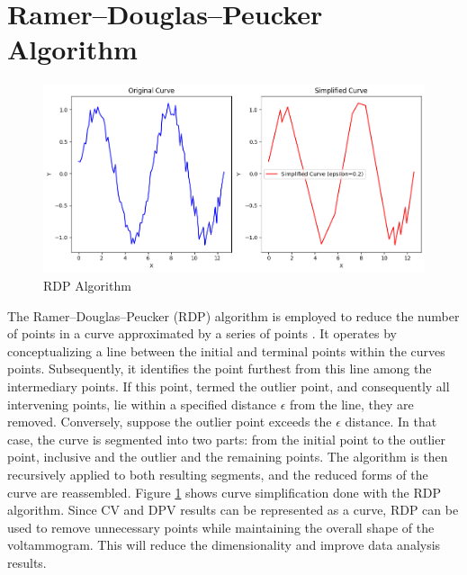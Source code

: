 \section{Ramer–Douglas–Peucker Algorithm}
\begin{figure}[!h]
  \centering
    \includegraphics[width=1.0\textwidth]{figures/rdp.png}
    \caption{RDP Algorithm}
    \label{rdp}
\end{figure}
The Ramer–Douglas–Peucker (RDP) algorithm is employed to reduce the number of points in a curve approximated by a series of points \cite{Wu2004-gc}. It operates by conceptualizing a line between the initial and terminal points within the curve\textquotesingle s points. Subsequently, it identifies the point furthest from this line among the intermediary points. If this point, termed the outlier point, and consequently all intervening points, lie within a specified distance $\epsilon$ from the line, they are removed. Conversely, suppose the outlier point exceeds the $\epsilon$ distance. In that case, the curve is segmented into two parts: from the initial point to the outlier point, inclusive and the outlier and the remaining points. The algorithm is then recursively applied to both resulting segments, and the reduced forms of the curve are reassembled. Figure \ref{rdp} shows curve simplification done with the RDP algorithm. Since CV and DPV results can be represented as a curve, RDP can be used to remove unnecessary points while maintaining the overall shape of the voltammogram. This will reduce the dimensionality and improve data analysis results.
